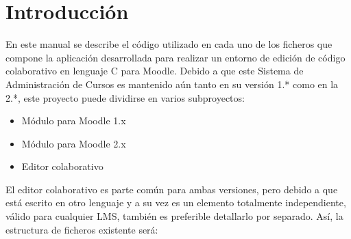 \chapter[Introducción]{\label{}
Introducción}

En este manual se describe el código utilizado en cada uno de los ficheros que compone la aplicación desarrollada para realizar un entorno de edición de código colaborativo en lenguaje C para Moodle. Debido a que este Sistema de Administración de Cursos es mantenido aún tanto en su versión 1.* como en la 2.*, este proyecto puede dividirse en varios subproyectos:

\begin{itemize}
	\bfseries
	\renewcommand{\labelitemi}{$\bullet$}
	\item Módulo para Moodle 1.x
	\item Módulo para Moodle 2.x
	\item Editor colaborativo
\end{itemize}

El editor colaborativo es parte común para ambas versiones, pero debido a que está escrito en otro lenguaje y a su vez es un elemento totalmente independiente, válido para cualquier LMS, también es preferible detallarlo por separado. Así, la estructura de ficheros existente será:

